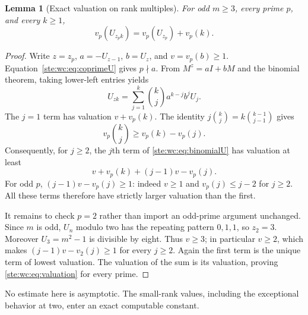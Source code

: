 \documentclass[11pt,letterpaper]{article}
\newtheorem{lemma}[theorem]{Lemma}
\theoremstyle{definition}
\theoremstyle{remark}
\begin{document}
\begin{lemma}[Exact valuation on rank multiples]\label{ste:wc:lem:valuation}
For odd $m\geq3$, every prime $p$, and every $k\geq1$,
\begin{equation}\label{ste:wc:eq:valuation}
 v_p(U_{z_pk})=v_p(U_{z_p})+v_p(k).
\end{equation}
\end{lemma}
\begin{proof}
Write $z=z_p$, $a=-U_{z-1}$, $b=U_z$, and $v=v_p(b)\geq1$.
Equation~\eqref{ste:wc:eq:coprimeU} gives $p\nmid a$. From
$M^z=aI+bM$ and the binomial theorem, taking lower-left entries yields
\begin{equation}\label{ste:wc:eq:binomialU}
 U_{zk}=\sum_{j=1}^{k}\binom{k}{j}a^{k-j}b^j U_j.
\end{equation}
The $j=1$ term has valuation $v+v_p(k)$. The identity
$j\binom{k}{j}=k\binom{k-1}{j-1}$ gives
\[
 v_p\!\binom{k}{j}\geq v_p(k)-v_p(j).
\]
Consequently, for $j\geq2$, the $j$th term of \eqref{ste:wc:eq:binomialU} has
valuation at least
\[
 v+v_p(k)+(j-1)v-v_p(j).
\]
For odd $p$, $(j-1)v-v_p(j)\geq1$: indeed $v\geq1$ and
$v_p(j)\leq j-2$ for $j\geq2$. All these terms therefore have strictly
larger valuation than the first.

It remains to check $p=2$ rather than import an odd-prime argument
unchanged. Since $m$ is odd, $U_n$ modulo two has the repeating pattern
$0,1,1$, so $z_2=3$. Moreover $U_3=m^2-1$ is divisible by eight. Thus
$v\geq3$; in particular $v\geq2$, which makes
$(j-1)v-v_2(j)\geq1$ for every $j\geq2$. Again the first term is the
unique term of lowest valuation. The valuation of the sum is its
valuation, proving \eqref{ste:wc:eq:valuation} for every prime.
\end{proof}

No estimate here is asymptotic. The small-rank values, including the
exceptional behavior at two, enter an exact computable constant.
\end{document}

